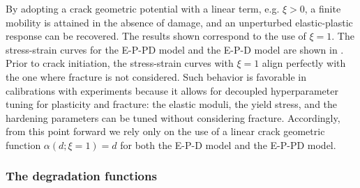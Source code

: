 

By adopting a crack geometric potential with a linear term, e.g. $\xi > 0$, a finite mobility is attained in the absence of damage, and an unperturbed elastic-plastic response can be recovered. The results shown correspond to the use of  $\xi = 1$.  The stress-strain curves for the E-P-PD model and the E-P-D model are shown in . Prior to crack initiation, the stress-strain curves with $\xi = 1$ align perfectly with the one where fracture is not considered. Such behavior is favorable in calibrations with experiments because it allows for decoupled hyperparameter tuning for plasticity and fracture: the elastic moduli, the yield stress, and the hardening parameters can be tuned without considering fracture. Accordingly, from this point forward we rely only on the use of a linear crack geometric function $\alpha(d; \xi = 1) = d$ for both the E-P-D model and the E-P-PD model.

\subsubsection{The degradation functions}
\label{section: Chapter5/verification/homogenized/degradation}

